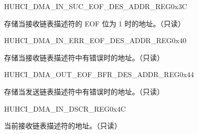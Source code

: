 \begin{register}{H}{UHCI\_DMA\_IN\_SUC\_EOF\_DES\_ADDR\_REG}{0x3C}\label{regdesc:UHCIDMAINSUCEOFDESADDRREG}
%
\regnewline%
\begin{regdesc}\begin{reglist}
\item [UHCI\_DMA\_IN\_SUC\_EOF\_DES\_ADDR\_REG] 存储当接收链表描述符的 EOF 位为 1 时的地址。（只读）
\end{reglist}\end{regdesc}
\end{register}


\begin{register}{H}{UHCI\_DMA\_IN\_ERR\_EOF\_DES\_ADDR\_REG}{0x40}\label{regdesc:UHCIDMAINERREOFDESADDRREG}
%
\regnewline%
\begin{regdesc}\begin{reglist}
\item [UHCI\_DMA\_IN\_ERR\_EOF\_DES\_ADDR\_REG] 存储当接收链表描述符中有错误时的地址。（只读）
\end{reglist}\end{regdesc}
\end{register}


\begin{register}{H}{UHCI\_DMA\_OUT\_EOF\_BFR\_DES\_ADDR\_REG}{0x44}\label{regdesc:UHCIDMAOUTEOFBFRDESADDRREG}
%
\regnewline%
\begin{regdesc}\begin{reglist}
\item [UHCI\_DMA\_OUT\_EOF\_BFR\_DES\_ADDR\_REG] 存储当发送链表描述符中有错误时的地址。（只读）
\end{reglist}\end{regdesc}
\end{register}


\begin{register}{H}{UHCI\_DMA\_IN\_DSCR\_REG}{0x4C}\label{regdesc:UHCIDMAINDSCRREG}
%
\regnewline%
\begin{regdesc}\begin{reglist}
\item [UHCI\_DMA\_IN\_DSCR\_REG] 当前接收链表描述符的地址。（只读）
\end{reglist}\end{regdesc}
\end{register}


